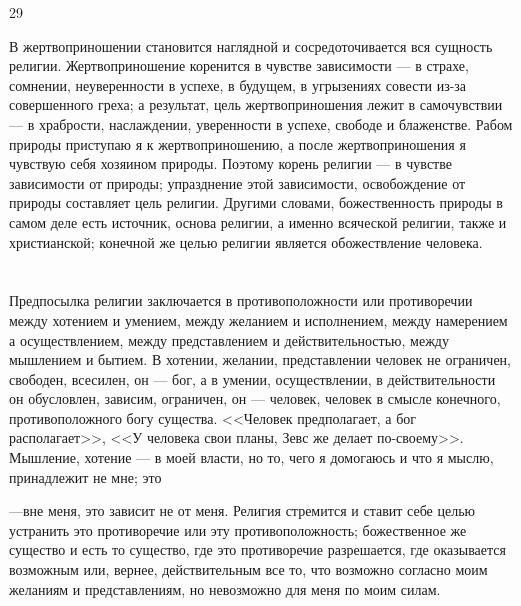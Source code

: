\documentclass[12pt]{article}
\begin{document}
29

В жертвоприношении становится наглядной и сосредоточивается вся сущность религии. Жертвоприношение коренится в чувстве зависимости --- в страхе, сомнении, неуверенности в успехе, в будущем, в угрызениях совести из-за совершенного греха; а результат, цель жертвоприношения лежит в самочувствии --- в храбрости, наслаждении, уверенности в успехе, свободе и блаженстве. Рабом природы приступаю я к жертвоприношению, а после жертвоприношения я чувствую себя хозяином природы. Поэтому корень религии --- в чувстве зависимости от природы; упразднение этой зависимости, освобождение от природы составляет цель религии. Другими словами, божественность природы в самом деле есть источник, основа религии, а именно всяческой религии, также и христианской; конечной же целью религии является обожествление человека.



\section{}

Предпосылка религии заключается в противоположности или противоречии между хотением и умением, между желанием и исполнением, между намерением а осуществлением, между представлением и действительностью, между мышлением и бытием. В хотении, желании, представлении человек не ограничен, свободен, всесилен, он --- бог, а в умении, осуществлении, в действительности он обусловлен, зависим, ограничен, он --- человек, человек в смысле конечного, противоположного богу существа. <<Человек предполагает, а бог располагает>>, <<У человека свои планы, Зевс же делает по-своему>>. Мышление, хотение --- в моей власти, но то, чего я домогаюсь и что я мыслю, принадлежит не мне; это

---вне меня, это зависит не от меня. Религия стремится и ставит себе целью устранить это противоречие или эту противоположность; божественное же существо и есть то существо, где это противоречие разрешается, где оказывается возможным или, вернее, действительным все то, что возможно согласно моим желаниям и представлениям, но невозможно для меня по моим силам.



\section{}
\end{document}
